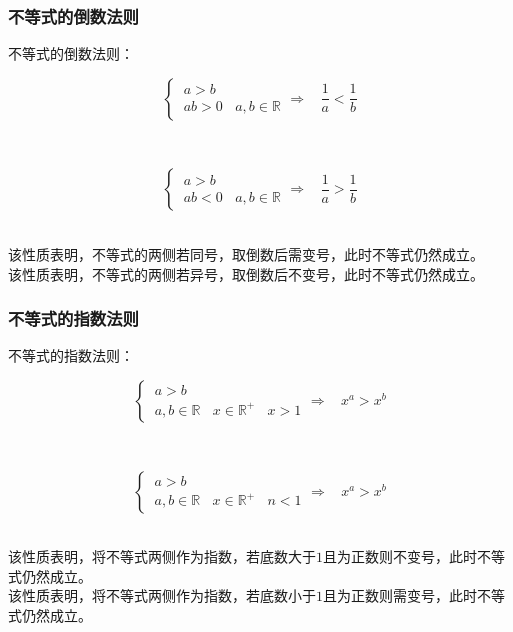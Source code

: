 \documentclass[UTF8]{ctexart}
\begin{document}
\subsubsection{不等式的倒数法则}
    不等式的倒数法则：
    \begin{large}
        \begin{equation*}
            \begin{cases}
                ~a>b\\[3mm]
                ~ab>0~~~~a,b\in\mathbb{R}
            \end{cases}
            \Rightarrow~~~~\frac{1}{a}<\frac{1}{b}
        \end{equation*}
    \end{large}\\
    \begin{large}
        \begin{equation*}
            \begin{cases}
                ~a>b\\[3mm]
                ~ab<0~~~~a,b\in\mathbb{R}
            \end{cases}
            \Rightarrow~~~~\frac{1}{a}>\frac{1}{b}
        \end{equation*}
    \end{large}\\[1mm]
    该性质表明，不等式的两侧若同号，取倒数后需变号，此时不等式仍然成立。\\[3mm]
    该性质表明，不等式的两侧若异号，取倒数后不变号，此时不等式仍然成立。

\newpage

\subsubsection{不等式的指数法则}
    不等式的指数法则：
    \begin{large}
        \begin{equation*}
            \begin{cases}
                ~a>b\\[3mm]
                ~a,b\in\mathbb{R}~~~~x\in\mathbb{R^+}~~~~x>1
            \end{cases}
            \Rightarrow~~~~x^a>x^b
        \end{equation*}
    \end{large}\\
    \begin{large}
        \begin{equation*}
            \begin{cases}
                ~a>b\\[3mm]
                ~a,b\in\mathbb{R}~~~~x\in\mathbb{R^+}~~~~n<1
            \end{cases}
            \Rightarrow~~~~x^a>x^b
        \end{equation*}
    \end{large}\\[1mm]
    该性质表明，将不等式两侧作为指数，若底数大于$1$且为正数则不变号，此时不等式仍然成立。\\[3mm]
    该性质表明，将不等式两侧作为指数，若底数小于$1$且为正数则需变号，此时不等式仍然成立。\\
\end{document}
